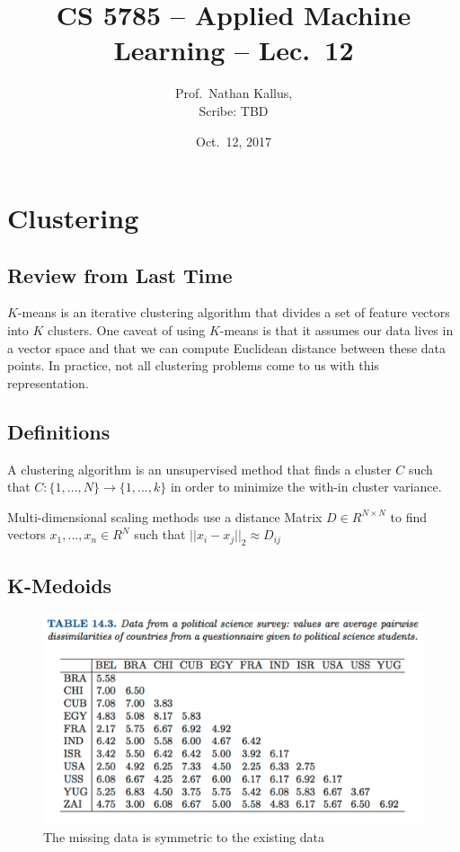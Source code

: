 \documentclass[a4paper]{article}
\title{CS 5785 -- Applied Machine Learning -- Lec.\ 12}
\author{Prof.\ Nathan Kallus, \\Scribe: TBD}
\date{Oct.\ 12, 2017}
\begin{document}
\maketitle


\section{Clustering}

\subsection{Review from Last Time}
$K$-means is an iterative clustering algorithm that divides a set of feature vectors into $K$ clusters.  One caveat of using $K$-means is that it assumes our data lives in a vector space and that we can compute Euclidean distance between these data points.  In practice, not all clustering problems come to us with this representation.
\subsection{Definitions}
A clustering algorithm is an unsupervised method that finds a cluster $C$ such that $C:\{1, ..., N\} \rightarrow \{1, ..., k\}$ in order to minimize the with-in cluster variance.

Multi-dimensional scaling methods use a distance Matrix $D \in R^{N\times N}$ to find vectors $x_1, ..., x_n \in R^N$ such that $||x_i - x_j||_2 \approx D_{ij}$
\subsection{K-Medoids}

\begin{figure}
\centering
\includegraphics[width=1.0\textwidth]{DissimilaritiesTable.png}
\caption{\label{fig:dissimilaritiesTable} The missing data is symmetric to the existing data}
\end{figure}
\end{document}
